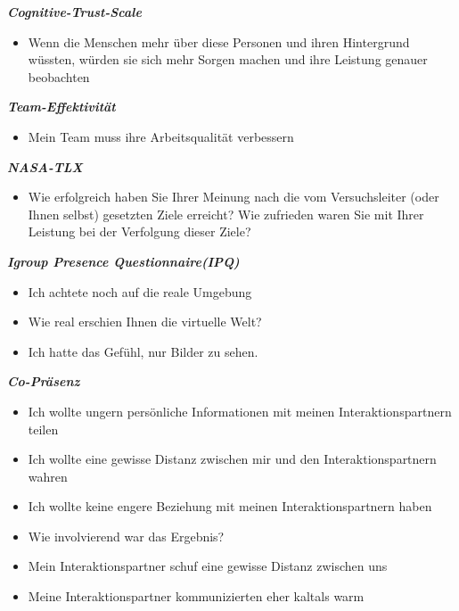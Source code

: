 \documentclass[a4paper,11pt]{article}%
\renewcommand{\\}{\vspace*{0.5\baselineskip} \newline}
\begin{document}
\textbf{\textit{Cognitive-Trust-Scale}}
\begin{itemize}
	\item Wenn die Menschen mehr über diese Personen und ihren Hintergrund wüssten, würden sie sich mehr Sorgen machen und ihre Leistung genauer beobachten
\end{itemize}

\textbf{\textit{Team-Effektivität}}
\begin{itemize}
	\item Mein Team muss ihre Arbeitsqualität verbessern
\end{itemize}

\textbf{\textit{NASA-TLX}}
\begin{itemize}
	\item Wie erfolgreich haben Sie Ihrer Meinung nach die vom Versuchsleiter (oder Ihnen selbst) gesetzten Ziele erreicht? Wie zufrieden waren Sie mit Ihrer Leistung bei der Verfolgung dieser Ziele? 
\end{itemize}

\textbf{\textit{Igroup Presence Questionnaire(IPQ)}}
\begin{itemize}
	\item Ich achtete noch auf die reale Umgebung
	\item Wie real erschien Ihnen die virtuelle Welt?
	\item Ich hatte das Gefühl, nur Bilder zu sehen. 
\end{itemize}

\textbf{\textit{Co-Präsenz}}
\begin{itemize}
	\item Ich wollte ungern persönliche Informationen mit meinen Interaktionspartnern teilen
	\item Ich wollte eine gewisse Distanz zwischen mir und den Interaktionspartnern wahren
	\item Ich wollte keine engere Beziehung mit meinen Interaktionspartnern haben
	\item Wie involvierend war das Ergebnis?
	\item Mein Interaktionspartner schuf eine gewisse Distanz zwischen uns
	\item Meine Interaktionspartner kommunizierten eher \flqq kalt\frqq als \flqq warm \frqq
\end{itemize}
\end{document}
